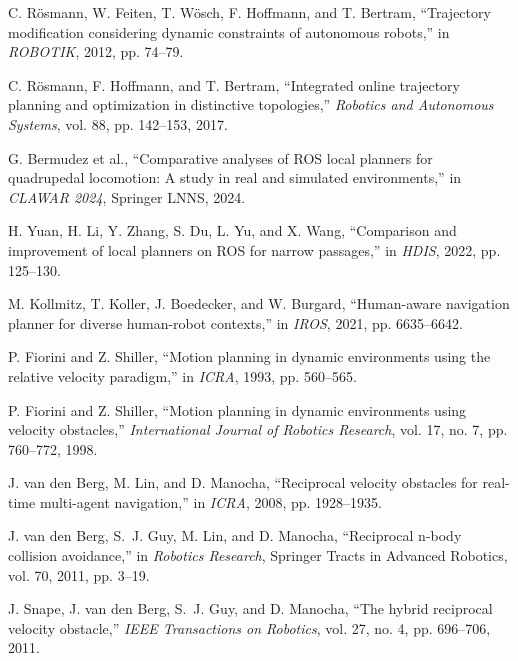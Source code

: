 \documentclass[12pt,a4paper,oneside]{book}
\begin{document}
\begin{enumerate}[label={[\arabic*]}, leftmargin=*]
\item \label{Rosmann2012} C. Rösmann, W. Feiten, T. Wösch, F. Hoffmann, and T. Bertram, ``Trajectory modification considering dynamic constraints of autonomous robots,'' in \emph{ROBOTIK}, 2012, pp. 74--79.

\item \label{Rosmann2017} C. Rösmann, F. Hoffmann, and T. Bertram, ``Integrated online trajectory planning and optimization in distinctive topologies,'' \emph{Robotics and Autonomous Systems}, vol. 88, pp. 142--153, 2017.

\item \label{Bermudez2024} G. Bermudez et al., ``Comparative analyses of ROS local planners for quadrupedal locomotion: A study in real and simulated environments,'' in \emph{CLAWAR 2024}, Springer LNNS, 2024.

\item \label{Yuan2022} H. Yuan, H. Li, Y. Zhang, S. Du, L. Yu, and X. Wang, ``Comparison and improvement of local planners on ROS for narrow passages,'' in \emph{HDIS}, 2022, pp. 125--130.

\item \label{Kollmitz2021} M. Kollmitz, T. Koller, J. Boedecker, and W. Burgard, ``Human-aware navigation planner for diverse human-robot contexts,'' in \emph{IROS}, 2021, pp. 6635--6642.

\item \label{Fiorini1993} P. Fiorini and Z. Shiller, ``Motion planning in dynamic environments using the relative velocity paradigm,'' in \emph{ICRA}, 1993, pp. 560--565.

\item \label{Fiorini1998} P. Fiorini and Z. Shiller, ``Motion planning in dynamic environments using velocity obstacles,'' \emph{International Journal of Robotics Research}, vol. 17, no. 7, pp. 760--772, 1998.

\item \label{VandenBerg2008} J. van den Berg, M. Lin, and D. Manocha, ``Reciprocal velocity obstacles for real-time multi-agent navigation,'' in \emph{ICRA}, 2008, pp. 1928--1935.

\item \label{VandenBerg2011} J. van den Berg, S.~J. Guy, M. Lin, and D. Manocha, ``Reciprocal n-body collision avoidance,'' in \emph{Robotics Research}, Springer Tracts in Advanced Robotics, vol. 70, 2011, pp. 3--19.

\item \label{Snape2011} J. Snape, J. van den Berg, S.~J. Guy, and D. Manocha, ``The hybrid reciprocal velocity obstacle,'' \emph{IEEE Transactions on Robotics}, vol. 27, no. 4, pp. 696--706, 2011.


\end{enumerate}
\end{document}
